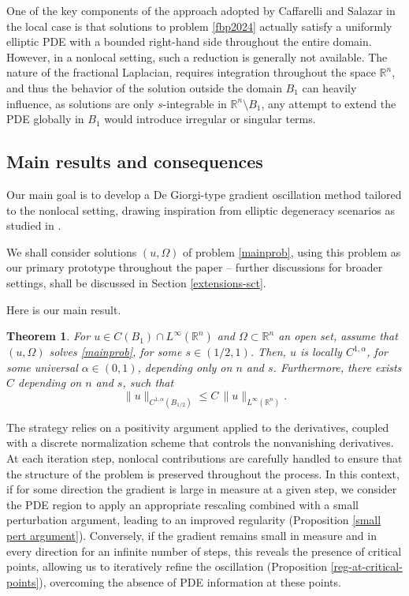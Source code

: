 \documentclass[reqno,11pt]{amsart}
\newtheorem{theorem}{Theorem}[section]
\numberwithin{equation}{section}
\numberwithin{equation}{section}
\begin{document}
One of the key components of the approach adopted by Caffarelli and Salazar in the local case \cite{CS02} is that solutions to problem \eqref{fbp2024} actually satisfy a uniformly elliptic PDE with a bounded right-hand side throughout the entire domain. However, in a nonlocal setting, such a reduction is generally not available. The nature of the fractional Laplacian, requires integration throughout the space $\mathbb{R}^n$, and thus the behavior of the solution outside the domain $B_1$ can heavily influence, as solutions are only $s$-integrable in $\mathbb{R}^n \setminus B_1$, any attempt to extend the PDE globally in $B_1$ would introduce irregular or singular terms.

\subsection{Main results and consequences}
Our main goal is to develop a De Giorgi-type gradient oscillation method tailored to the nonlocal setting, drawing inspiration from elliptic degeneracy scenarios as studied in \cite{IJS, JS}.

We shall consider solutions $(u, \Omega)$ of problem \eqref{mainprob}, using this problem as our primary prototype throughout the paper -- further discussions for broader settings, shall be discussed in Section \ref{extensions-sct}. 

Here is our main result. 

\begin{theorem}\label{main theorem}
For $u \in C(B_1) \cap L^\infty(\mathbb{R}^n)$ and $\Omega \subset \mathbb{R}^n$ an open set, assume that $(u,\Omega)$ solves \eqref{mainprob}, for some $s\in (1/2,1)$. Then, $u$ is locally $C^{1,\alpha}$, for some universal $\alpha\in (0,1)$, depending only on $n$ and $s$. Furthermore, there exists $C$ depending on $n$ and $s$, such that
$$
    \|u\|_{C^{1,\alpha}(B_{1/2})} \leq C\,\|u\|_{L^\infty(\mathbb{R}^n)}.
$$   
\end{theorem}

The strategy relies on a positivity argument applied to the derivatives, coupled with a discrete normalization scheme that controls the nonvanishing derivatives. At each iteration step, nonlocal contributions are carefully handled to ensure that the structure of the problem is preserved throughout the process. In this context, if for some direction the gradient is large in measure at a given step, we consider the PDE region to apply an appropriate rescaling combined with a small perturbation argument, leading to an improved regularity (Proposition \ref{small pert argument}). Conversely, if the gradient remains small in measure and in every direction for an infinite number of steps, this reveals the presence of critical points, allowing us to iteratively refine the oscillation (Proposition \ref{reg-at-critical-points}), overcoming the absence of PDE information at these points.
\end{document}
